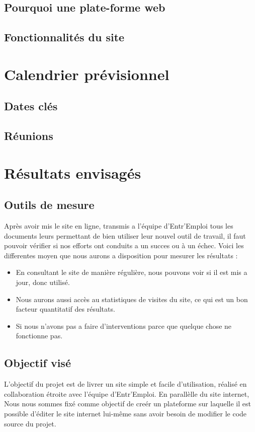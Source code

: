 \documentclass[a4paper, 12pt]{report}
\begin{document}
\section{Pourquoi une plate-forme web}
\section{Fonctionnalités du site}

\chapter{Calendrier prévisionnel}
\thispagestyle{fancy}
\section{Dates clés}
\section{Réunions}

\chapter{Résultats envisagés}
\thispagestyle{fancy}
\section{Outils de mesure}
Après avoir mis le site en ligne, transmis a l'équipe d'Entr'Emploi tous les documents leurs permettant de bien utiliser leur nouvel outil de travail, il faut pouvoir vérifier si nos efforts
ont conduits a un succes ou à un échec. Voici les differentes moyen que nous aurons a disposition pour mesurer les résultats :
\begin{itemize}
    \item En consultant le site de manière régulière, nous pouvons voir si il est mis a jour, donc utilisé.
    \item Nous aurons aussi accès au statistiques de visites du site, ce qui est un bon facteur quantitatif des résultats.
    \item Si nous n'avons pas a faire d'interventions parce que quelque chose ne fonctionne pas.
\end{itemize}
\section{Objectif visé}

L'objectif du projet est de livrer un site simple et facile d'utilisation, réalisé en collaboration étroite avec l'équipe d'Entr'Emploi.
En parallèlle du site internet, Nous nous sommes fixé comme objectif de creér un plateforme sur laquelle il est possible d'éditer
le site internet lui-même sans avoir besoin de modifier le code source du projet.
\end{document}
